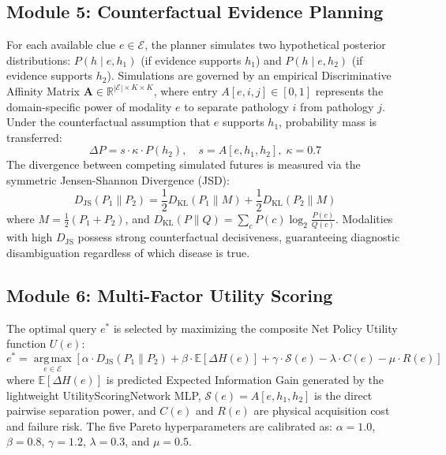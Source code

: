 \documentclass[conference]{IEEEtran}
\begin{document}
\subsection{Module 5: Counterfactual Evidence Planning}
For each available clue $e \in \mathcal{E}$, the planner simulates two hypothetical posterior distributions: $P(h \mid e, h_1)$ (if evidence supports $h_1$) and $P(h \mid e, h_2)$ (if evidence supports $h_2$). Simulations are governed by an empirical Discriminative Affinity Matrix $\mathbf{A} \in \mathbb{R}^{|\mathcal{E}| \times K \times K}$, where entry $A[e, i, j] \in [0, 1]$ represents the domain-specific power of modality $e$ to separate pathology $i$ from pathology $j$. Under the counterfactual assumption that $e$ supports $h_1$, probability mass is transferred:
\begin{equation}
    \Delta P = s \cdot \kappa \cdot P(h_2), \quad s = A[e, h_1, h_2], \; \kappa = 0.7
\end{equation}
The divergence between competing simulated futures is measured via the symmetric Jensen-Shannon Divergence (JSD):
\begin{equation}
    D_{\text{JS}}(P_1 \parallel P_2) = \frac{1}{2} D_{\text{KL}}(P_1 \parallel M) + \frac{1}{2} D_{\text{KL}}(P_2 \parallel M)
\end{equation}
where $M = \frac{1}{2}(P_1 + P_2)$, and $D_{\text{KL}}(P \parallel Q) = \sum_c P(c) \log_2 \frac{P(c)}{Q(c)}$. Modalities with high $D_{\text{JS}}$ possess strong counterfactual decisiveness, guaranteeing diagnostic disambiguation regardless of which disease is true.

\subsection{Module 6: Multi-Factor Utility Scoring}
The optimal query $e^*$ is selected by maximizing the composite Net Policy Utility function $U(e)$:
\begin{equation}
    e^* = \operatorname*{arg\,max}_{e \in \mathcal{E}} \left[ \alpha \cdot D_{\text{JS}}(P_1 \parallel P_2) + \beta \cdot \mathbb{E}[\Delta H(e)] + \gamma \cdot \mathcal{S}(e) - \lambda \cdot C(e) - \mu \cdot R(e) \right]
\end{equation}
where $\mathbb{E}[\Delta H(e)]$ is predicted Expected Information Gain generated by the lightweight UtilityScoringNetwork MLP, $\mathcal{S}(e) = A[e, h_1, h_2]$ is the direct pairwise separation power, and $C(e)$ and $R(e)$ are physical acquisition cost and failure risk. The five Pareto hyperparameters are calibrated as: $\alpha = 1.0$, $\beta = 0.8$, $\gamma = 1.2$, $\lambda = 0.3$, and $\mu = 0.5$.
\end{document}
